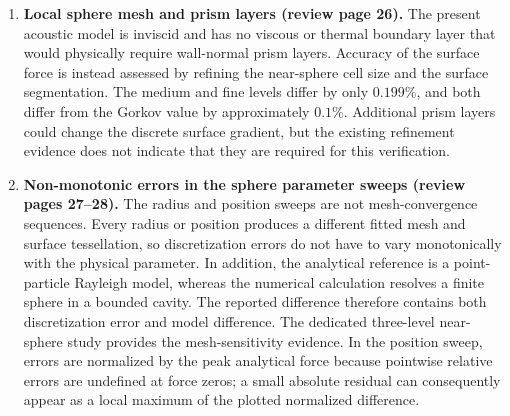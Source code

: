 \documentclass[final,12pt,nopreprintline,longtitle]{elsarticle}
\begin{document}
\begin{enumerate}[leftmargin=*,label=\textbf{R\arabic*.}]
\item \textbf{Local sphere mesh and prism layers (review page 26).}
The present acoustic model is inviscid and has no viscous or thermal boundary
layer that would physically require wall-normal prism layers.  Accuracy of the
surface force is instead assessed by refining the near-sphere cell size and the
surface segmentation.  The medium and fine levels differ by only $0.199\%$, and
both differ from the Gorkov value by approximately $0.1\%$.  Additional prism
layers could change the discrete surface gradient, but the existing refinement
evidence does not indicate that they are required for this verification.

\item \textbf{Non-monotonic errors in the sphere parameter sweeps (review
pages 27--28).}
The radius and position sweeps are not mesh-convergence sequences.  Every
radius or position produces a different fitted mesh and surface tessellation,
so discretization errors do not have to vary monotonically with the physical
parameter.  In addition, the analytical reference is a point-particle Rayleigh
model, whereas the numerical calculation resolves a finite sphere in a bounded
cavity.  The reported difference therefore contains both discretization error
and model difference.  The dedicated three-level near-sphere study provides the
mesh-sensitivity evidence.  In the position sweep, errors are normalized by the
peak analytical force because pointwise relative errors are undefined at force
zeros; a small absolute residual can consequently appear as a local maximum of
the plotted normalized difference.

\end{enumerate}

\fi %
\end{document}
